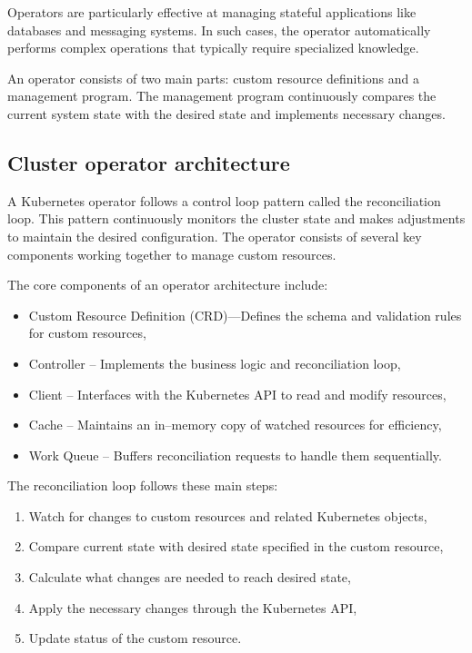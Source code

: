 Operators are particularly effective at managing stateful applications like databases and messaging systems.
In such cases, the operator automatically performs complex operations that typically require specialized knowledge.

An operator consists of two main parts: custom resource definitions and a management program.
The management program continuously compares the current system state with the desired state and implements necessary changes.

\subsection{Cluster operator architecture}

A Kubernetes operator follows a control loop pattern called the reconciliation loop.
This pattern continuously monitors the cluster state and makes adjustments to maintain the desired configuration.
The operator consists of several key components working together to manage custom resources.

The core components of an operator architecture include:

\begin{itemize}
    \item Custom Resource Definition (CRD)—Defines the schema and validation rules for custom resources,
    \item Controller -- Implements the business logic and reconciliation loop,
    \item Client -- Interfaces with the Kubernetes API to read and modify resources,
    \item Cache -- Maintains an in--memory copy of watched resources for efficiency,
    \item Work Queue -- Buffers reconciliation requests to handle them sequentially.
\end{itemize}

The reconciliation loop follows these main steps:
\begin{enumerate}
    \item Watch for changes to custom resources and related Kubernetes objects,
    \item Compare current state with desired state specified in the custom resource,
    \item Calculate what changes are needed to reach desired state,
    \item Apply the necessary changes through the Kubernetes API,
    \item Update status of the custom resource.
\end{enumerate}

